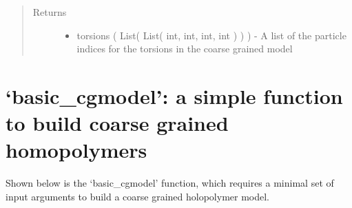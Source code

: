 \documentclass[letterpaper,12pt,english,openany,oneside]{sphinxmanual}
\begin{document}
\begin{fulllineitems}
\begin{fulllineitems}
\begin{quote}
\begin{description}
\item[{Returns}] \leavevmode
\begin{itemize}
\item {} 
torsions ( List( List( int, int, int, int ) ) ) - A list of the particle indices for the torsions in the coarse grained model

\end{itemize}


\end{description}\end{quote}

\end{fulllineitems}


\end{fulllineitems}


\newpage


\section{‘basic\_cgmodel’: a simple function to build coarse grained homopolymers}
\label{\detokenize{cg_model:basic-cgmodel-a-simple-function-to-build-coarse-grained-homopolymers}}
Shown below is the ‘basic\_cgmodel’ function, which requires a minimal set of input arguments to build a coarse grained holopolymer model.

\label{\detokenize{cg_model:module-cg_model.cgmodel}}
\end{document}
